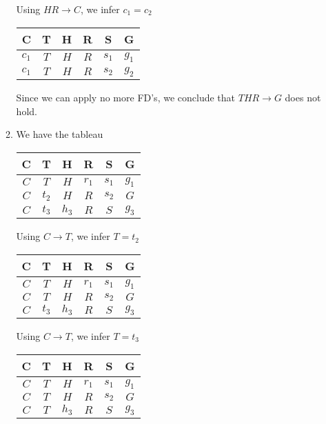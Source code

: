 \documentclass[12pt,letterpaper]{article}
\begin{document}
\begin{enumerate}
\begin{enumerate}
          Using $HR \rightarrow C$, we infer $c_1 = c_2$

          \begin{tabular}{c | c | c | c | c | c}
            C & T & H & R & S & G \\
            \hline
            \hline
            $c_1$   & $T$   & $H$   & $R$   & $s_1$   & $g_1$   \\
            $c_1$   & $T$   & $H$   & $R$   & $s_2$   & $g_2$   \\
          \end{tabular}

          Since we can apply no more FD's,
          we conclude that $THR \rightarrow G$ does not hold.

        \item
          We have the tableau

          \begin{tabular}{c | c | c | c | c | c}
            C & T & H & R & S & G \\
            \hline
            \hline
            $C$     & $T$   & $H$   & $r_1$ & $s_1$ & $g_1$ \\
            $C$     & $t_2$ & $H$   & $R$   & $s_2$ & $G$   \\
            $C$     & $t_3$ & $h_3$ & $R$   & $S$   & $g_3$ \\
          \end{tabular}

          Using $C \rightarrow T$, we infer $T = t_2$

          \begin{tabular}{c | c | c | c | c | c}
            C & T & H & R & S & G \\
            \hline
            \hline
            $C$     & $T$   & $H$   & $r_1$ & $s_1$ & $g_1$ \\
            $C$     & $T$   & $H$   & $R$   & $s_2$ & $G$   \\
            $C$     & $t_3$ & $h_3$ & $R$   & $S$   & $g_3$ \\
          \end{tabular}

          Using $C \rightarrow T$, we infer $T = t_3$

          \begin{tabular}{c | c | c | c | c | c}
            C & T & H & R & S & G \\
            \hline
            \hline
            $C$     & $T$   & $H$   & $r_1$ & $s_1$ & $g_1$ \\
            $C$     & $T$   & $H$   & $R$   & $s_2$ & $G$   \\
            $C$     & $T$   & $h_3$ & $R$   & $S$   & $g_3$ \\
          \end{tabular}


\end{enumerate}
\end{enumerate}
\end{document}
